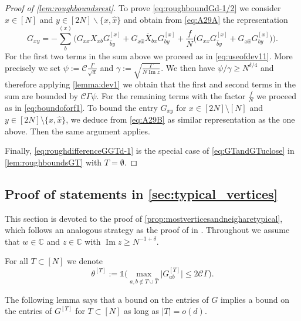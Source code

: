 \documentclass[11pt]{article}
\DeclareMathOperator{\Ima}{Im}
\newcommand{\abs}[1]{\left| #1 \right|}
\newcommand{\absn}[1]{\bigl| #1 \bigr|} %
\newcommand{\C}{\mathbb{C}}
\renewcommand{\Im}{\Ima}
\theoremstyle{plain}
\theoremstyle{remark}
\numberwithin{equation}{section}
\newcommand*\barr[1]{\overline{#1}}
\newcommand*\bset[1]{[#1]}
\newcommand*\ubarr[1]{{\widehat{#1}}}
\begin{document}
\begin{proof}[Proof of \cref{lem:roughboundsrest}]
		To prove \cref{eq:roughboundGd-1/2} we consider $x\in [N]$ and $y \in [2N] \backslash \{x,\ubarr{x} \}$ and obtain from \cref{eq:A29A} the representation  
		\begin{equation*}
			G_{xy} = - \sum_{b}^{(x)} \bigg( G_{xx} {X}_{xb}G_{\ubarr{b}y}^{\bset{x}} + G_{x\ubarr{x}} \barr{X}_{bx}G_{by}^{\bset{x}} + \frac{f}{N} \bigg( G_{xx} G_{\ubarr{b}y}^{\bset{x}} + G_{x\ubarr{x}} G_{by}^{\bset{x}}\bigg) \bigg).
		\end{equation*}
		For the first two terms in the sum above we proceed as in \cref{eq:useofdev11}.  More precisely we set $\psi := \mathcal C \frac{\Gamma}{\sqrt{d}}$ and $\gamma:= \sqrt{\frac{\Gamma}{N \Ima z}}$. We then have $\psi/\gamma \ge N^{\delta/4}$  and therefore applying 
		\cref{lemma:dev1} we obtain that the first and second terms in the sum are bounded by $\mathcal C \Gamma \psi $. For the remaining terms with the factor $\frac{f}{N}$  we proceed as in \cref{eq:boundoforf1}. To bound the entry $G_{xy}$ for $x \in [2N] \setminus [N]$ and $y \in [2N] \setminus \{x,\ubarr{x}\}$, we deduce from \cref{eq:A29B} as 
		similar representation as the one above. Then the same argument applies. 
		
		Finally, \cref{eq:roughdifferenceGGTd-1} is the special case of \cref{eq:GTandGTuclose} in   \cref{lem:roughboundsGT} with $T= \emptyset$.
	\end{proof}
	\subsection{Proof of statements in \cref{sec:typical_vertices}}\label{subsection:proofs_typical_vert}
		This section is devoted to the proof of \cref{prop:mostverticesandneigharetypical}, which follows an analogous  strategy as the proof of \cite[Proposition~4.8]{alt2021delocalization} in   \cite[Section~4.2]{alt2021delocalization}.  
		Throughout we assume that $w \in \C$ and $z \in \C$ with $\Im z \geq N^{-1 + \delta}$. 
	
 For all $T \subset [N]$ we denote
	\begin{equation}\label{thetaT}
		\theta^{[T]} :=\mathds{1} \bigg( \max_{a,b \notin T\cup \ubarr{T}} \absn{G^{\bset{T}}_{ab}} \le 2 \mathcal C \Gamma \bigg).
	\end{equation}

	The following lemma says that a bound on the entries of $G$ implies a bound on the entries of $G^{\bset{T}}$ for $T \subset [N]$ as long as $\abs{T} = o(d)$.
\end{document}
